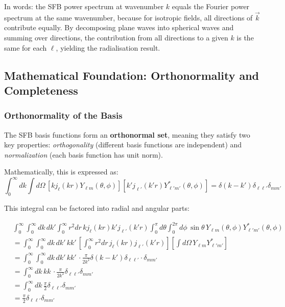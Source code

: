 In words: the SFB power spectrum at wavenumber $k$ equals the Fourier power spectrum at the same wavenumber, because for isotropic fields, all directions of $\vec{k}$ contribute equally. By decomposing plane waves into spherical waves and summing over directions, the contribution from all directions to a given $k$ is the same for each $\ell$, yielding the radialisation result.

\subsection{Mathematical Foundation: Orthonormality and Completeness}

\subsubsection{Orthonormality of the Basis}

The SFB basis functions form an \textbf{orthonormal set}, meaning they satisfy two key properties: \emph{orthogonality} (different basis functions are independent) and \emph{normalization} (each basis function has unit norm).

Mathematically, this is expressed as:
\begin{equation}
\int_0^\infty dk \int d\Omega \, \left[k j_\ell(kr) Y_{\ell m}(\theta, \phi)\right] \left[k' j_{\ell'}(k'r) Y_{\ell' m'}^*(\theta, \phi)\right] = \delta(k - k') \delta_{\ell \ell'} \delta_{m m'}
\label{eq:full_orthonormality}
\end{equation}

This integral can be factored into radial and angular parts:

\begin{align}
&\int_0^\infty \int_0^\infty dk \, dk' \int_0^\infty r^2 dr \, k j_\ell(kr) k' j_{\ell'}(k'r) \int_0^\pi d\theta \int_0^{2\pi} d\phi \, \sin\theta \, Y_{\ell m}(\theta, \phi) Y_{\ell' m'}^*(\theta, \phi) \\
&= \int_0^\infty \int_0^\infty dk \, dk' \, k k' \, \left[\int_0^\infty r^2 dr \, j_\ell(kr) j_{\ell'}(k'r)\right] \left[\int d\Omega \, Y_{\ell m} Y_{\ell' m'}^*\right] \\
&= \int_0^\infty \int_0^\infty dk \, dk' \, k k' \, \cdot \frac{\pi}{2k^2} \delta(k - k') \delta_{\ell \ell'} \cdot \delta_{m m'} \\
&= \int_0^\infty dk \, k k \, \cdot \frac{\pi}{2k^2} \delta_{\ell \ell'} \delta_{m m'} \\
&= \int_0^\infty dk \, \frac{\pi}{2} \delta_{\ell \ell'} \delta_{m m'} \\
&= \frac{\pi}{2} \delta_{\ell \ell'} \delta_{m m'}
\end{align}


